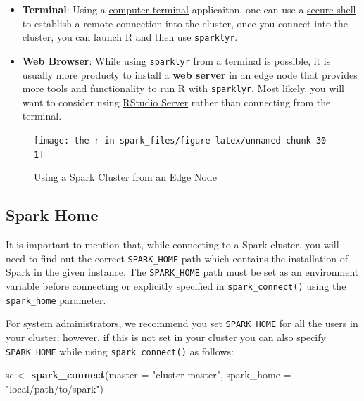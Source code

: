 \documentclass[]{book}
\newenvironment{Shaded}{\begin{snugshade}}{\end{snugshade}}
\newcommand{\DataTypeTok}[1]{\textcolor[rgb]{0.13,0.29,0.53}{#1}}
\newcommand{\KeywordTok}[1]{\textcolor[rgb]{0.13,0.29,0.53}{\textbf{#1}}}
\newcommand{\NormalTok}[1]{#1}
\newcommand{\StringTok}[1]{\textcolor[rgb]{0.31,0.60,0.02}{#1}}
\providecommand{\tightlist}{%
  \setlength{\itemsep}{0pt}\setlength{\parskip}{0pt}}
\theoremstyle{definition}
\theoremstyle{definition}
\theoremstyle{definition}
\theoremstyle{remark}
\begin{document}
\begin{itemize}
\tightlist
\item
  \textbf{Terminal}: Using a
  \href{https://en.wikipedia.org/wiki/Computer_terminal}{computer
  terminal} applicaiton, one can use a
  \href{https://en.wikipedia.org/wiki/Secure_Shell}{secure shell} to
  establish a remote connection into the cluster, once you connect into
  the cluster, you can launch R and then use \texttt{sparklyr}.
\item
  \textbf{Web Browser}: While using \texttt{sparklyr} from a terminal is
  possible, it is usually more producty to install a \textbf{web server}
  in an edge node that provides more tools and functionality to run R
  with \texttt{sparklyr}. Most likely, you will want to consider using
  \href{RStudio\%20Server}{RStudio Server} rather than connecting from
  the terminal.
\end{itemize}

\begin{figure}

{\centering \texttt{[image: the-r-in-spark\_files/figure-latex/unnamed-chunk-30-1]} 

}

\caption{Using a Spark Cluster from an Edge Node}\label{fig:unnamed-chunk-30}
\end{figure}

\hypertarget{spark-home}{%
\subsection{Spark Home}\label{spark-home}}

It is important to mention that, while connecting to a Spark cluster,
you will need to find out the correct \texttt{SPARK\_HOME} path which
contains the installation of Spark in the given instance. The
\texttt{SPARK\_HOME} path must be set as an environment variable before
connecting or explicitly specified in \texttt{spark\_connect()} using
the \texttt{spark\_home} parameter.

For system administrators, we recommend you set \texttt{SPARK\_HOME} for
all the users in your cluster; however, if this is not set in your
cluster you can also specify \texttt{SPARK\_HOME} while using
\texttt{spark\_connect()} as follows:

\begin{Shaded}
\begin{Highlighting}[]
\NormalTok{sc <-}\StringTok{ }\KeywordTok{spark_connect}\NormalTok{(}\DataTypeTok{master =} \StringTok{"cluster-master"}\NormalTok{, }\DataTypeTok{spark_home =} \StringTok{"local/path/to/spark"}\NormalTok{)}
\end{Highlighting}
\end{Shaded}
\end{document}
